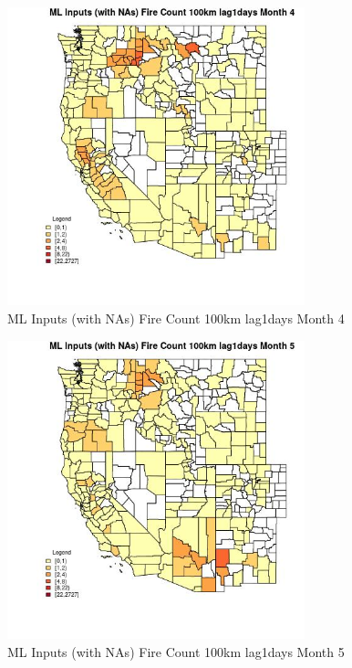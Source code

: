 \begin{figure} 
\centering  
\includegraphics[width=0.77\textwidth]{Code_Outputs/Report_ML_input_PM25_Step4_part_f_de_duplicated_aveswNAs_CountyFire_Count_100km_lag1daysmedianMonth4.jpg} 
\caption{\label{fig:Report_ML_input_PM25_Step4_part_f_de_duplicated_aveswNAsCountyFire_Count_100km_lag1daysmedianMonth4}ML Inputs (with NAs) Fire Count 100km lag1days Month 4} 
\end{figure} 
 

\begin{figure} 
\centering  
\includegraphics[width=0.77\textwidth]{Code_Outputs/Report_ML_input_PM25_Step4_part_f_de_duplicated_aveswNAs_CountyFire_Count_100km_lag1daysmedianMonth5.jpg} 
\caption{\label{fig:Report_ML_input_PM25_Step4_part_f_de_duplicated_aveswNAsCountyFire_Count_100km_lag1daysmedianMonth5}ML Inputs (with NAs) Fire Count 100km lag1days Month 5} 
\end{figure} 
 

